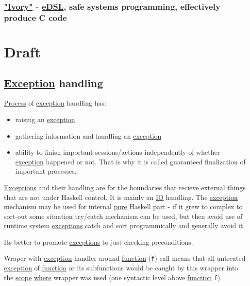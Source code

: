 \documentclass[a4paper,14pt,oneside]{book}
\begin{document}
\section{\href{https://github.com/GaloisInc/ivory}{"Ivory"} - \hyperref[orgc059501]{eDSL}, safe systems programming, effectively produce C code}
\label{sec:org8ab7b68}

\part{Draft}
\label{sec:orgf8300dc}

\chapter{\hyperref[orga34d850]{Exception} handling}
\label{sec:orgeb96bc1}

\hyperref[org7aaca48]{Process} of \hyperref[orga34d850]{exception} handling has:
\begin{itemize}
\item raising an \hyperref[orga34d850]{exception}
\item gathering information and handling an \hyperref[orga34d850]{exception}
\item ability to finish important sessions/actions independently of whether \hyperref[orga34d850]{exception} happened or not. That is why it is called guaranteed finalization of important processes.
\end{itemize}

\hyperref[org92013ae]{Exceptions} and their handling are for the boundaries that recieve external things that are not under Haskell control. It is mainly an \hyperref[org12ccf19]{IO} handling. The \hyperref[orga34d850]{exception} mechanism may be used for internal \hyperref[orgf329f49]{pure} Haskell part - if it grew to complex to sort-out some situation try/catch mechanism can be used, but then avoid use of runtime system \hyperref[org92013ae]{exceptions} catch and sort programmically and generally avoid it.

Its better to promote \hyperref[org92013ae]{exceptions} to just checking preconditions.

Wraper with \hyperref[orga34d850]{exception} handler around \hyperref[org1a6611b]{function} (\texttt{f}) call means that all untreated \hyperref[orga34d850]{exception} of \hyperref[org1a6611b]{function} or its subfunctions would be caught by this wrapper into the \hyperref[orgeca725f]{scope} \hyperref[orgb660a1e]{where} wrapper was used (one syntactic level above \hyperref[org1a6611b]{function} \texttt{f}).
\end{document}
